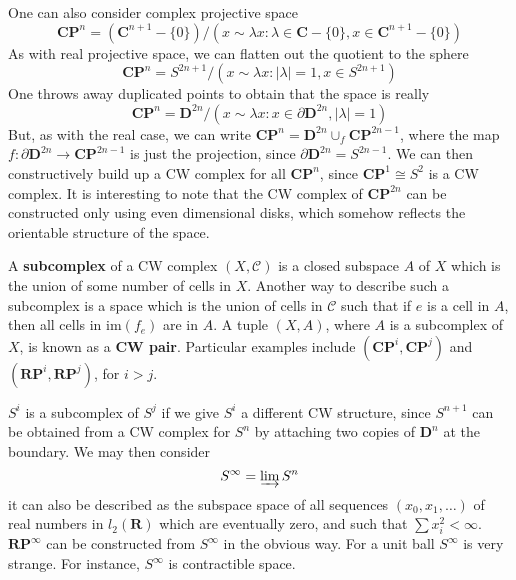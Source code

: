 \begin{example}
    One can also consider complex projective space
    \[ \mathbf{C} \mathbf{P}^n = (\mathbf{C}^{n+1} - \{ 0 \}) / {(x \sim \lambda x : \lambda \in \mathbf{C} - \{ 0 \}, x \in \mathbf{C}^{n+1} - \{ 0 \})} \]
    As with real projective space, we can flatten out the quotient to the sphere
    \[ \mathbf{C} \mathbf{P}^n = S^{2n+1} / {(x \sim \lambda x : |\lambda| = 1, x \in S^{2n + 1})} \]
    One throws away duplicated points to obtain that the space is really
    \[ \mathbf{C} \mathbf{P}^n = \mathbf{D}^{2n} / {(x \sim \lambda x : x \in \partial \mathbf{D}^{2n}, |\lambda| = 1)} \]
    But, as with the real case, we can write $\mathbf{C} \mathbf{P}^n = \mathbf{D}^{2n} \cup_f \mathbf{C} \mathbf{P}^{2n - 1}$, where the map $f: \partial \mathbf{D}^{2n} \to \mathbf{C} \mathbf{P}^{2n-1}$ is just the projection, since $\partial \mathbf{D}^{2n} = S^{2n-1}$. We can then constructively build up a CW complex for all $\mathbf{C} \mathbf{P}^n$, since $\mathbf{C} \mathbf{P}^1 \cong S^2$ is a CW complex. It is interesting to note that the CW complex of $\mathbf{C} \mathbf{P}^{2n}$ can be constructed only using even dimensional disks, which somehow reflects the orientable structure of the space.
\end{example}

A {\bf subcomplex} of a CW complex $(X,\mathcal{C})$ is a closed subspace $A$ of $X$ which is the union of some number of cells in $X$. Another way to describe such a subcomplex is a space which is the union of cells in $\mathcal{C}$ such that if $e$ is a cell in $A$, then all cells in $\text{im}(f_e)$ are in $A$. A tuple $(X,A)$, where $A$ is a subcomplex of $X$, is known as a {\bf CW pair}. Particular examples include $(\mathbf{C} \mathbf{P}^i, \mathbf{C} \mathbf{P}^j)$ and $(\mathbf{R} \mathbf{P}^i, \mathbf{R} \mathbf{P}^j)$, for $i > j$.

\begin{example}
    $S^i$ is a subcomplex of $S^j$ if we give $S^i$ a different CW structure, since $S^{n+1}$ can be obtained from a CW complex for $S^n$ by attaching two copies of $\mathbf{D}^n$ at the boundary. We may then consider
    \[ S^\infty = \varinjlim S^n \]
    it can also be described as the subspace space of all sequences $(x_0, x_1, \dots )$ of real numbers in $l_2(\mathbf{R})$ which are eventually zero, and such that $\sum x_i^2 < \infty$. $\mathbf{R} \mathbf{P}^\infty$ can be constructed from $S^\infty$ in the obvious way. For a unit ball $S^\infty$ is very strange. For instance, $S^\infty$ is contractible space.
\end{example}

